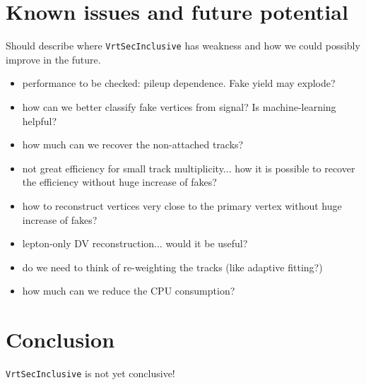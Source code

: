 \documentclass[NOTE, atlasdraft=true, texlive=2018, UKenglish]{\ATLASLATEXPATH atlasdoc}
\begin{document}
\section{Known issues and future potential}
Should describe where {\tt VrtSecInclusive} has weakness and how we could possibly improve in the future.
\begin{itemize}
\item performance to be checked: pileup dependence. Fake yield may explode?
\item how can we better classify fake vertices from signal? Is machine-learning helpful?
\item how much can we recover the non-attached tracks?
\item not great efficiency for small track multiplicity... how it is possible to recover the efficiency without huge increase of fakes?
\item how to reconstruct vertices very close to the primary vertex without huge increase of fakes?
\item lepton-only DV reconstruction... would it be useful?
\item do we need to think of re-weighting the tracks (like adaptive fitting?)
\item how much can we reduce the CPU consumption?
\end{itemize}


\section{Conclusion}
\label{sec:conclusion}
{\tt VrtSecInclusive} is not yet conclusive!

\printbibliography
%
%

\end{document}
